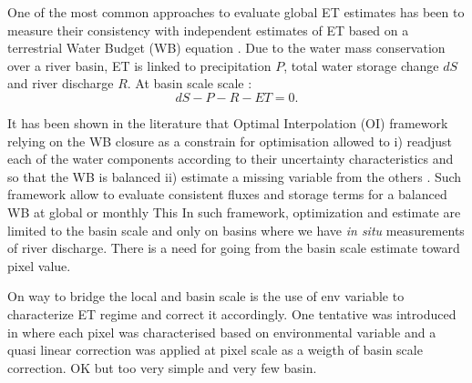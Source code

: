 \documentclass[draft]{agujournal2019}
\begin{document}

One of the most common approaches to evaluate global ET estimates has been to measure their consistency with independent estimates of ET based on a terrestrial Water Budget (WB) equation \cite{Rodell2011a,Carter2018}. Due to the water mass conservation over a river basin, ET is linked to precipitation $P$, total water storage change $dS$ and river discharge $R$. At basin scale scale :
\begin{equation}
    dS-P-R-ET=0.
\end{equation}

It has been shown in the literature that Optimal Interpolation (OI) framework relying on the WB closure as a constrain for optimisation allowed to i) readjust each of the water components according to their uncertainty characteristics \cite{Sahoo2011,Pan2012,Rodell2015a,Aires2014, Pellet2019a} and so that the WB is balanced ii) estimate a missing variable from the others \cite{Munier2014c,Pellet2020,Pellet2021c}. Such framework allow to evaluate consistent fluxes and storage terms for a balanced WB at global \cite{Rodell2015a} or monthly This In such framework, optimization and estimate are limited to the basin scale and only on basins where we have {\it in situ} measurements of river discharge. There is a need for going from the basin scale estimate toward pixel value. 

On way to bridge the local and basin scale is the use of env variable to characterize ET regime and correct it accordingly. One tentative was introduced in \cite{Munier2017} where each pixel was characterised based on environmental variable and a quasi linear correction was applied at pixel scale as a weigth of basin scale correction. OK but too very simple and very few basin. 



\end{document}
